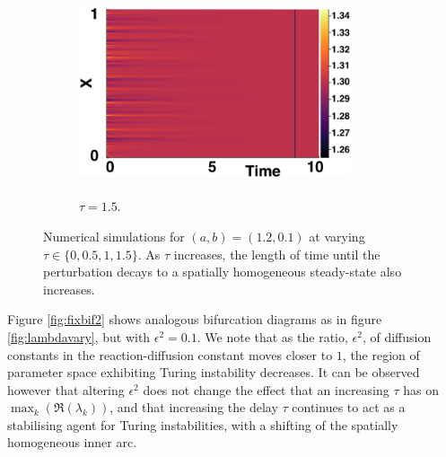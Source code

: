 \documentclass[12pt]{report}
\begin{document}
\begin{figure}[H]
    \hfill
    \begin{subfigure}[b]{0.45\textwidth}
        \centering
        \includegraphics[width=8cm,height=6cm]{decay4.png}
        \caption{$\tau=1.5$.}
        \label{}
    \end{subfigure}
    \caption{Numerical simulations for $(a,b)=(1.2,0.1)$ at varying $\tau\in\{0,0.5,1,1.5\}$. As $\tau$ increases, the length of time until the perturbation decays to a spatially homogeneous steady-state also increases.}
    \label{fig:decaytime}
\end{figure}
Figure \ref{fig:fixbif2} shows analogous bifurcation diagrams as in figure \ref{fig:lambdavary}, but with $\epsilon^2=0.1$. We note that as the ratio, $\epsilon^2$, of diffusion constants in the reaction-diffusion constant moves closer to $1$, the region of parameter space exhibiting Turing instability decreases. It can be observed however that altering $\epsilon^2$ does not change the effect that an increasing $\tau$ has on $\max_k(\Re(\lambda_k))$, and that increasing the delay $\tau$ continues to act as a stabilising agent for Turing instabilities, with a shifting of the spatially homogeneous inner arc.
\end{document}

